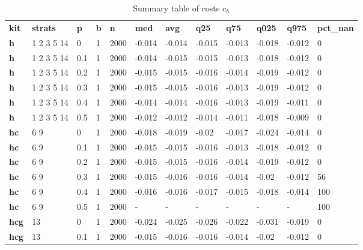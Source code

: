\begin{longtable}[h]{|p{0.8cm}|p{1.5cm}|p{1cm}|p{1cm}|p{1cm}|p{1cm}|p{1cm}|p{1cm}|p{1cm}|p{1cm}|p{1cm}|p{1.5cm}|}
\caption{Summary table of costs $c_h$}
\label{tab:costs_mod_h} \\
      \hline
\textbf{ kit} & \textbf{ strats} & \textbf{ p} & \textbf{ b} & \textbf{ n} & \textbf{ med} & \textbf{ avg} & \textbf{ q25} & \textbf{ q75} & \textbf{ q025} & \textbf{ q975} & \textbf{ pct\_nan}
           \\
  \textbf{h   } &  1 2 3 5 14 &   0 & 1 & 2000 & -0.014 & -0.014 & -0.015 & -0.013 & -0.018 & -0.012 &   0
           \\
  \textbf{h   } &  1 2 3 5 14 & 0.1 & 1 & 2000 & -0.014 & -0.015 & -0.015 & -0.013 & -0.018 & -0.012 &   0
           \\
  \textbf{h   } &  1 2 3 5 14 & 0.2 & 1 & 2000 & -0.015 & -0.015 & -0.016 & -0.014 & -0.019 & -0.012 &   0
           \\
  \textbf{h   } &  1 2 3 5 14 & 0.3 & 1 & 2000 & -0.015 & -0.015 & -0.016 & -0.013 & -0.019 & -0.012 &   0
           \\
  \textbf{h   } &  1 2 3 5 14 & 0.4 & 1 & 2000 & -0.014 & -0.014 & -0.016 & -0.013 & -0.019 & -0.011 &   0
           \\
  \textbf{h   } &  1 2 3 5 14 & 0.5 & 1 & 2000 & -0.012 & -0.012 & -0.014 & -0.011 & -0.018 & -0.009 &   0
           \\
  \textbf{hc  } &  6 9        &   0 & 1 & 2000 & -0.018 & -0.019 &  -0.02 & -0.017 & -0.024 & -0.014 &   0
           \\
  \textbf{hc  } &  6 9        & 0.1 & 1 & 2000 & -0.015 & -0.015 & -0.016 & -0.013 & -0.018 & -0.012 &   0
           \\
  \textbf{hc  } &  6 9        & 0.2 & 1 & 2000 & -0.015 & -0.015 & -0.016 & -0.014 & -0.019 & -0.012 &   0
           \\
  \textbf{hc  } &  6 9        & 0.3 & 1 & 2000 & -0.015 & -0.016 & -0.016 & -0.014 &  -0.02 & -0.012 &  56
           \\
  \textbf{hc  } &  6 9        & 0.4 & 1 & 2000 & -0.016 & -0.016 & -0.017 & -0.015 & -0.018 & -0.014 & 100
           \\
  \textbf{hc  } &  6 9        & 0.5 & 1 & 2000 & - & - & - & - & - & - & 100
           \\
  \textbf{hcg } &  13         &   0 & 1 & 2000 & -0.024 & -0.025 & -0.026 & -0.022 & -0.031 & -0.019 &   0
           \\
  \textbf{hcg } &  13         & 0.1 & 1 & 2000 & -0.015 & -0.016 & -0.016 & -0.014 &  -0.02 & -0.012 &   0

\end{longtable}
